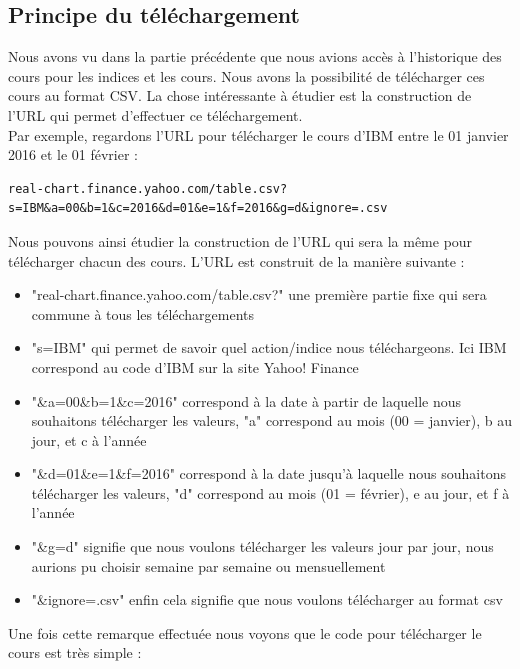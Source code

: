 \subsection{Principe du téléchargement}

Nous avons vu dans la partie précédente que nous avions accès à l'historique des cours pour les indices et les cours. Nous avons la possibilité de télécharger ces cours au format CSV. La chose intéressante à étudier est la construction de l'URL qui permet d'effectuer ce téléchargement. \\ 

Par exemple, regardons l'URL pour télécharger le cours d'IBM entre le 01 janvier 2016 et le 01 février : 
\begin{lstlisting}
real-chart.finance.yahoo.com/table.csv?s=IBM&a=00&b=1&c=2016&d=01&e=1&f=2016&g=d&ignore=.csv
\end{lstlisting}
Nous pouvons ainsi étudier la construction de l'URL qui sera la même pour télécharger chacun des cours. L'URL est construit de la manière suivante : 
\begin{itemize} 
\item "real-chart.finance.yahoo.com/table.csv?" une première partie fixe qui sera commune à tous les téléchargements 
\item "s=IBM" qui permet de savoir quel action/indice nous téléchargeons. Ici IBM correspond au code d'IBM sur la site Yahoo! Finance
\item "\&a=00\&b=1\&c=2016" correspond à la date à partir de laquelle nous souhaitons télécharger les valeurs, "a" correspond au mois (00 = janvier), b au jour, et c à l'année
\item "\&d=01\&e=1\&f=2016" correspond à la date jusqu'à laquelle nous souhaitons télécharger les valeurs, "d" correspond au mois (01 = février), e au jour, et f à l'année
\item "\&g=d" signifie que nous voulons télécharger les valeurs jour par jour, nous aurions pu choisir semaine par semaine ou mensuellement
\item "\&ignore=.csv" enfin cela signifie que nous voulons télécharger au format csv
\end{itemize}

Une fois cette remarque effectuée nous voyons que le code pour télécharger le cours est très simple : 

